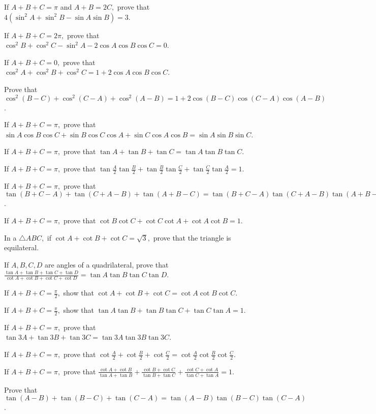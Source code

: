 \item If $A + B + C = \pi$ and $A + B = 2C,$ prove that $4(\sin^2A + \sin^2B - \sin A\sin B) = 3$.
\item If $A + B + C = 2\pi,$ prove that $\cos^2B + \cos^2C - \sin^2A - 2\cos A\cos B\cos C = 0$.
\item If $A + B + C = 0,$ prove that $\cos^2A + \cos^2B + \cos^2C = 1 + 2\cos A\cos B\cos C$.
\item Prove that $\cos^2(B - C) + \cos^2(C - A) + \cos^2(A - B) = 1 + 2\cos(B - C)\cos(C - A)\cos(A - B)$.
\item If $A + B + C = \pi,$ prove that $\sin A\cos B\cos C + \sin B\cos C\cos A + \sin C\cos A\cos B= \sin A\sin B\sin C$.
\item If $A + B + C = \pi,$ prove that $\tan A + \tan B + \tan C = \tan A\tan B\tan C$.
\item If $A + B + C = \pi,$ prove that $\tan\frac{A}{2}\tan\frac{B}{2} + \tan\frac{B}{2}\tan\frac{C}{2} +
  \tan\frac{C}{2}\tan\frac{A}{2} = 1$.
\item If $A + B + C = \pi,$ prove that $\tan(B + C - A) + \tan(C + A - B) + \tan(A + B - C) = \tan(B + C - A)\tan(C + A -
  B)\tan(A + B - C)$.
\item If $A + B + C = \pi,$ prove that $\cot B\cot C + \cot C\cot A + \cot A\cot B = 1$.
\item In a $\triangle ABC,$ if $\cot A + \cot B + \cot C = \sqrt{3},$ prove that the triangle is equilateral.
\item If $A, B, C, D$ are angles of a quadrilateral, prove that $\frac{\tan A + \tan B + \tan C + \tan D}{\cot A + \cot B
  + \cot C + \cot D} = \tan A\tan B\tan C\tan D$.
\item If $A + B + C = \frac{\pi}{2},$ show that $\cot A + \cot B + \cot C = \cot A\cot B\cot C$.
\item If $A + B + C = \frac{\pi}{2},$ show that $\tan A\tan B + \tan B\tan C + \tan C\tan A = 1$.
\item If $A + B + C = \pi,$ prove that $\tan 3A + \tan 3B + \tan 3C = \tan 3A\tan 3B\tan 3C$.
\item If $A + B + C = \pi,$ prove that $\cot \frac{A}{2} + \cot \frac{B}{2} + \cot \frac{C}{2} = \cot \frac{A}{2}\cot
  \frac{B}{2}\cot \frac{C}{2}$.
\item If $A + B + C = \pi,$ prove that $\frac{\cot A + \cot B}{\tan A + \tan B} + \frac{\cot B + \cot C}{\tan B + \tan C}
  + \frac{\cot C + \cot A}{\tan C + \tan A} = 1$.
\item Prove that $\tan(A - B) + \tan(B - C) + \tan(C - A) = \tan(A - B)\tan(B - C)\tan(C - A)$.
